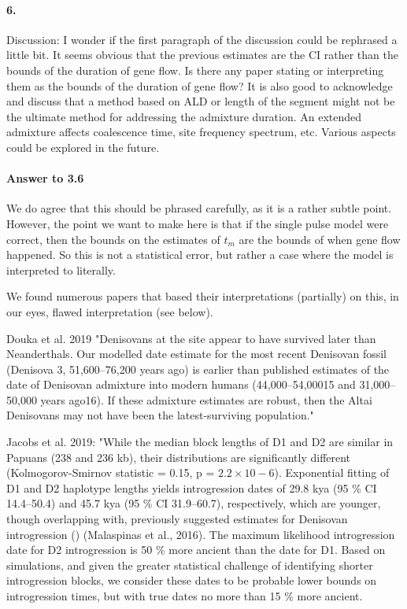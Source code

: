 \documentclass[11pt]{article}
\let\oldparagraph\paragraph
\renewcommand{\paragraph}[1]{\oldparagraph{#1}\mbox{}}
\begin{document}
\paragraph{6.} 
Discussion: I wonder if the first paragraph of the discussion could be rephrased a little bit. It seems obvious that the previous estimates are the CI rather than the bounds of the duration of gene flow. Is there any paper stating or interpreting them as the bounds of the duration of gene flow? It is also good to acknowledge and discuss that a method based on ALD or length of the segment might not be the ultimate method for addressing the admixture duration. An extended admixture affects coalescence time, site frequency spectrum, etc. Various aspects could be explored in the future.

\paragraph{Answer to 3.6}
We do agree that this should be phrased carefully, as it is a rather subtle point. However, the point we want to make here is that if the single pulse model were correct, then the bounds on the estimates of $t_m$ are  the bounds of when gene flow happened. So this is not a statistical error, but rather a case where the model is interpreted to literally. 

We found numerous papers that based their interpretations (partially) on this, in our eyes, flawed interpretation (see below).

Douka et al. 2019 "Denisovans at the site appear to have survived later than Neanderthals. Our modelled date estimate for the most recent Denisovan fossil (Denisova 3, 51,600–76,200 years ago) is earlier than published estimates of the date of Denisovan admixture into modern humans (44,000–54,00015 and 31,000–50,000 years ago16). If these admixture estimates are robust, then the Altai Denisovans may not have been the latest-surviving population."

Jacobs et al. 2019: "While the median block lengths of D1 and D2 are similar in Papuans (238 and 236 kb), their distributions are significantly different (Kolmogorov-Smirnov statistic = 0.15, p = $2.2 \times 10−6$). Exponential fitting of D1 and D2 haplotype lengths yields introgression dates of 29.8 kya (95 \% CI 14.4–50.4) and 45.7 kya (95 \% CI 31.9–60.7), respectively, which are younger, though overlapping with, previously suggested estimates for Denisovan introgression () (Malaspinas et al., 2016). The maximum likelihood introgression date for D2 introgression is 50 \% more ancient than the date for D1. Based on simulations, and given the greater statistical challenge of identifying shorter introgression blocks, we consider these dates to be probable lower bounds on introgression times, but with true dates no more than 15 \% more ancient.
\end{document}
